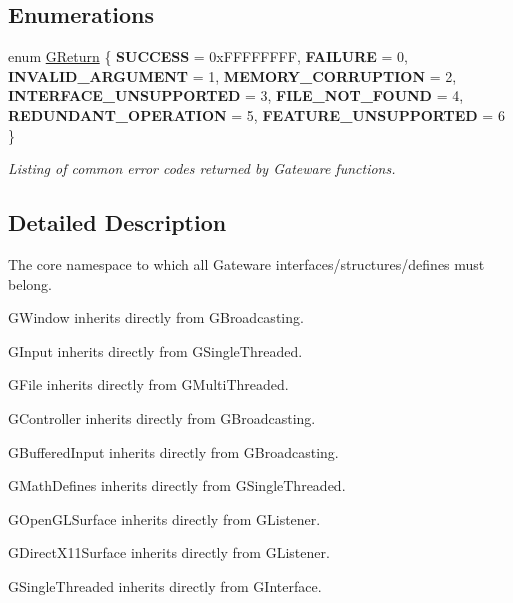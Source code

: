 \subsection*{Enumerations}
\begin{DoxyCompactItemize}
\item 
\mbox{\label{namespaceGW_a67a839e3df7ea8a5c5686613a7a3de21}} 
enum \mbox{\hyperlink{namespaceGW_a67a839e3df7ea8a5c5686613a7a3de21}{G\+Return}} \{ \newline
{\bfseries S\+U\+C\+C\+E\+SS} = 0x\+F\+F\+F\+F\+F\+F\+FF, 
{\bfseries F\+A\+I\+L\+U\+RE} = 0, 
{\bfseries I\+N\+V\+A\+L\+I\+D\+\_\+\+A\+R\+G\+U\+M\+E\+NT} = 1, 
{\bfseries M\+E\+M\+O\+R\+Y\+\_\+\+C\+O\+R\+R\+U\+P\+T\+I\+ON} = 2, 
\newline
{\bfseries I\+N\+T\+E\+R\+F\+A\+C\+E\+\_\+\+U\+N\+S\+U\+P\+P\+O\+R\+T\+ED} = 3, 
{\bfseries F\+I\+L\+E\+\_\+\+N\+O\+T\+\_\+\+F\+O\+U\+ND} = 4, 
{\bfseries R\+E\+D\+U\+N\+D\+A\+N\+T\+\_\+\+O\+P\+E\+R\+A\+T\+I\+ON} = 5, 
{\bfseries F\+E\+A\+T\+U\+R\+E\+\_\+\+U\+N\+S\+U\+P\+P\+O\+R\+T\+ED} = 6
 \}
\begin{DoxyCompactList}\small\item\em Listing of common error codes returned by Gateware functions. \end{DoxyCompactList}\end{DoxyCompactItemize}


\subsection{Detailed Description}
The core namespace to which all Gateware interfaces/structures/defines must belong. 

G\+Window inherits directly from G\+Broadcasting.

G\+Input inherits directly from G\+Single\+Threaded.

G\+File inherits directly from G\+Multi\+Threaded.

G\+Controller inherits directly from G\+Broadcasting.

G\+Buffered\+Input inherits directly from G\+Broadcasting.

G\+Math\+Defines inherits directly from G\+Single\+Threaded.

G\+Open\+G\+L\+Surface inherits directly from G\+Listener.

G\+Direct\+X11\+Surface inherits directly from G\+Listener.

G\+Single\+Threaded inherits directly from G\+Interface.

